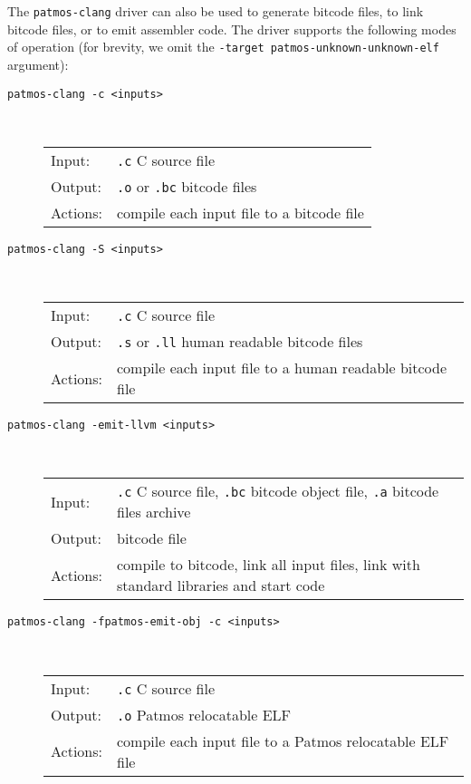 The \texttt{patmos-clang} driver can also be used to generate bitcode files, to link bitcode files, or to 
emit assembler code. The driver supports the following modes of operation (for brevity, we omit the
\texttt{-target patmos-unknown-unknown-elf} argument):


\begin{description}
\item[\texttt{patmos-clang -c <inputs>}] \hfill\\
  \begin{tabular}{ll}
  Input:   & \texttt{.c} C source file \\
  Output:  & \texttt{.o} or \texttt{.bc} bitcode files \\
  Actions: & compile each input file to a bitcode file
  \end{tabular}

\item[\texttt{patmos-clang -S <inputs>}] \hfill\\
  \begin{tabular}{ll}
  Input:   & \texttt{.c} C source file \\
  Output:  & \texttt{.s} or \texttt{.ll} human readable bitcode files \\
  Actions: & compile each input file to a human readable bitcode file
  \end{tabular}

\item[\texttt{patmos-clang -emit-llvm <inputs>}] \hfill\\
  \begin{tabular}{ll}
  Input:   & \texttt{.c} C source file, \texttt{.bc} bitcode object file, \texttt{.a} bitcode files archive \\
  Output:  & bitcode file \\
  Actions: & compile to bitcode, link all input files, link with standard libraries and start code \\
\end{tabular}

\item[\texttt{patmos-clang -fpatmos-emit-obj -c <inputs>}] \hfill\\
  \begin{tabular}{ll}
  Input:   & \texttt{.c} C source file \\
  Output:  & \texttt{.o} Patmos relocatable ELF \\
  Actions: & compile each input file to a Patmos relocatable ELF file
  \end{tabular}


\end{description}
